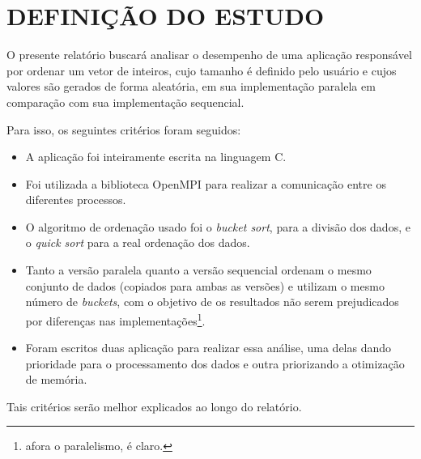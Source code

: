 \section{\normalsize DEFINIÇÃO DO ESTUDO}
	O presente relatório buscará analisar o desempenho de uma aplicação responsável por ordenar um vetor de inteiros, cujo tamanho é definido pelo usuário e  cujos valores são gerados de forma aleatória, em sua implementação paralela em comparação com sua implementação sequencial.
	
	Para isso, os seguintes critérios foram seguidos:
	\begin{itemize}
		\item A aplicação foi inteiramente escrita na linguagem C.
		\item Foi utilizada a biblioteca OpenMPI para realizar a comunicação entre os diferentes processos.
		\item O algoritmo de ordenação usado foi o \textit{bucket sort}, para a divisão dos dados, e o \textit{quick sort} para a real ordenação dos dados.
		\item Tanto a versão paralela quanto a versão sequencial ordenam o mesmo conjunto de dados (copiados para ambas as versões) e utilizam o mesmo número de \textit{buckets}, com o objetivo de os resultados não serem prejudicados por diferenças nas implementações\footnote{afora o paralelismo, é claro.}. 
		\item Foram escritos duas aplicação para realizar essa análise, uma delas dando prioridade para o processamento dos dados e outra priorizando a otimização de memória.
	\end{itemize}
	
	Tais critérios serão melhor explicados ao longo do relatório.
